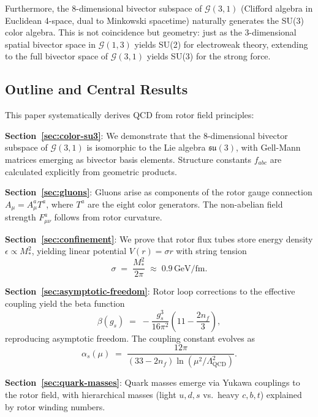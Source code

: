 \documentclass[11pt,a4paper]{article}
\newcommand{\Cl}{\mathcal{G}}
\theoremstyle{definition}
\theoremstyle{plain}
\theoremstyle{remark}
\begin{document}
Furthermore, the 8-dimensional bivector subspace of $\Cl(3,1)$ (Clifford algebra in Euclidean 4-space, dual to Minkowski spacetime) naturally generates the SU(3) color algebra. This is not coincidence but geometry: just as the 3-dimensional spatial bivector space in $\Cl(1,3)$ yields SU(2) for electroweak theory, extending to the full bivector space of $\Cl(3,1)$ yields SU(3) for the strong force.

\subsection{Outline and Central Results}

This paper systematically derives QCD from rotor field principles:

\textbf{Section~\ref{sec:color-su3}}: We demonstrate that the 8-dimensional bivector subspace of $\Cl(3,1)$ is isomorphic to the Lie algebra $\mathfrak{su}(3)$, with Gell-Mann matrices emerging as bivector basis elements. Structure constants $f_{abc}$ are calculated explicitly from geometric products.

\textbf{Section~\ref{sec:gluons}}: Gluons arise as components of the rotor gauge connection $A_\mu = A_\mu^a T^a$, where $T^a$ are the eight color generators. The non-abelian field strength $F_{\mu\nu}^a$ follows from rotor curvature.

\textbf{Section~\ref{sec:confinement}}: We prove that rotor flux tubes store energy density $\epsilon \propto M_\ast^2$, yielding linear potential $V(r) = \sigma r$ with string tension
\begin{equation}
\sigma \;=\; \frac{M_\ast^2}{2\pi} \;\approx\; 0.9\,\text{GeV/fm}.
\end{equation}

\textbf{Section~\ref{sec:asymptotic-freedom}}: Rotor loop corrections to the effective coupling yield the beta function
\begin{equation}
\beta(g_s) \;=\; -\frac{g_s^3}{16\pi^2}\left(11 - \frac{2n_f}{3}\right),
\end{equation}
reproducing asymptotic freedom. The coupling constant evolves as
\begin{equation}
\alpha_s(\mu) \;=\; \frac{12\pi}{(33 - 2n_f)\ln(\mu^2/\Lambda_{\mathrm{QCD}}^2)}.
\end{equation}

\textbf{Section~\ref{sec:quark-masses}}: Quark masses emerge via Yukawa couplings to the rotor field, with hierarchical masses (light $u,d,s$ vs.\ heavy $c,b,t$) explained by rotor winding numbers.
\end{document}
